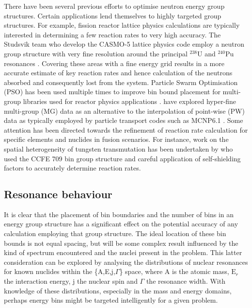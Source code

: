 There have been several previous efforts to optimise neutron energy group structures. Certain applications lend themselves to highly targeted group structures. For example, fission reactor lattice physics calculations are typically interested in determining a few reaction rates to very high accuracy. The Studsvik team who develop the CASMO-5 lattice physics code employ a neutron group structure with very fine resolution around the principal $^{238}\mathrm{U}$ and $^{240}\mathrm{Pu}$ resonances \cite{Rhodes2006}. Covering these areas with a fine energy grid results in a more accurate estimate of key reaction rates and hence calculation of the neutrons absorbed and consequently lost from the system. Particle Swarm Optimisation (PSO) has been used multiple times to improve bin bound placement for multi-group libraries used for reactor physics applications \cite{Yi2013} \cite{Akbari2012} \cite{Akbari2013} \cite{Fleming2016}. \citet{Morgan2013} have explored hyper-fine multi-group (MG) data as an alternative to the interpolation of point-wise (PW) data as typically employed by particle transport codes such as MCNP6.1 \cite{Goorley2012}. Some attention has been directed towards the refinement of reaction rate calculation for specific elements and nuclides in fusion scenarios. For instance, work on the spatial heterogeneity of tungsten transmutation has been undertaken by \citet{Gilbert2016} who used the CCFE 709 bin group structure and careful application of self-shielding factors to accurately determine reaction rates.

\subsection{Resonance behaviour}
It is clear that the placement of bin boundaries and the number of bins in an energy group structure has a significant effect on the potential accuracy of any calculation employing that group structure. The ideal location of these bin bounds is not equal spacing, but will be some complex result influenced by the kind of spectrum encountered and the nuclei present in the problem. This latter consideration can be explored by analysing the distributions of nuclear resonances for known nuclides within the \{A,E,j,$\Gamma$\} space, where A is the atomic mass, $\mathrm{E}_{r}$ the interaction energy, j the nuclear spin and $\Gamma$ the resonance width. With knowledge of these distributions, especially in the mass and energy domains, perhaps energy bins might be targeted intelligently for a given problem.

